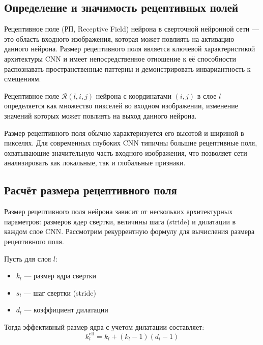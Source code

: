 \subsection{Определение и значимость рецептивных полей}
\label{theory:receptive_fields:definition}

Рецептивное поле (РП, Receptive Field) нейрона в сверточной нейронной сети — это область входного изображения, которая может повлиять на активацию данного нейрона. Размер рецептивного поля является ключевой характеристикой архитектуры CNN и имеет непосредственное отношение к её способности распознавать пространственные паттерны и демонстрировать инвариантность к смещениям.

\begin{definition}
Рецептивное поле $\mathcal{R}(l,i,j)$ нейрона с координатами $(i,j)$ в слое $l$ определяется как множество пикселей во входном изображении, изменение значений которых может повлиять на выход данного нейрона.
\end{definition}

Размер рецептивного поля обычно характеризуется его высотой и шириной в пикселях. Для современных глубоких CNN типичны большие рецептивные поля, охватывающие значительную часть входного изображения, что позволяет сети анализировать как локальные, так и глобальные признаки.

\subsection{Расчёт размера рецептивного поля}
\label{theory:receptive_fields:calculation}

Размер рецептивного поля нейрона зависит от нескольких архитектурных параметров: размеров ядер свертки, величины шага (stride) и дилатации в каждом слое CNN. Рассмотрим рекуррентную формулу для вычисления размера рецептивного поля.

Пусть для слоя $l$:
\begin{itemize}
    \item $k_l$ — размер ядра свертки
    \item $s_l$ — шаг свертки (stride)
    \item $d_l$ — коэффициент дилатации
\end{itemize}

Тогда эффективный размер ядра с учетом дилатации составляет:
\begin{equation}
k_l^{\text{eff}} = k_l + (k_l - 1)(d_l - 1)
\end{equation}

